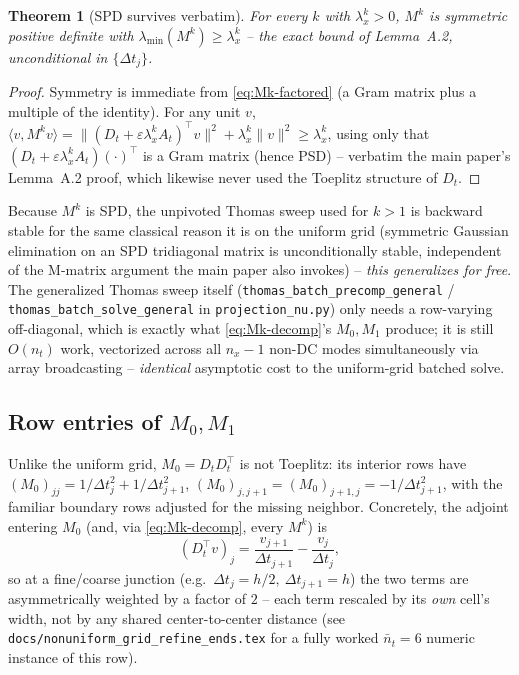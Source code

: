 \documentclass[11pt]{article}
\newtheorem{theorem}{Theorem}
\newcommand{\eps}{\varepsilon}
\newcommand{\dt}{\Delta t}
\newcommand{\code}[1]{\texttt{#1}}
\newcommand{\lx}{\lambda_x^k}
\begin{document}
\begin{theorem}[SPD survives verbatim]
\label{thm:spd}
For every $k$ with $\lx>0$, $M^k$ is symmetric positive definite with $\lambda_{\min}(M^k)\ge\lx$
-- the exact bound of Lemma~A.2, unconditional in $\{\dt_j\}$.
\end{theorem}
\begin{proof}
Symmetry is immediate from \eqref{eq:Mk-factored} (a Gram matrix plus a multiple of the
identity). For any unit $v$, $\langle v, M^kv\rangle = \|(D_t+\eps\lx A_t)^\top v\|^2 + \lx\|v\|^2
\ge \lx$, using only that $(D_t+\eps\lx A_t)(\cdot)^\top$ is a Gram matrix (hence PSD) --
verbatim the main paper's Lemma~A.2 proof, which likewise never used the Toeplitz structure of
$D_t$.
\end{proof}

Because $M^k$ is SPD, the unpivoted Thomas sweep used for $k>1$ is backward stable for the same
classical reason it is on the uniform grid (symmetric Gaussian elimination on an SPD tridiagonal
matrix is unconditionally stable, independent of the M-matrix argument the main paper also
invokes) -- \emph{this generalizes for free}. The generalized Thomas sweep itself
(\code{thomas\_batch\_precomp\_general} / \code{thomas\_batch\_solve\_general} in
\code{projection\_nu.py}) only needs a row-varying off-diagonal, which is exactly what
\eqref{eq:Mk-decomp}'s $M_0,M_1$ produce; it is still $O(n_t)$ work, vectorized across all
$n_x{-}1$ non-DC modes simultaneously via array broadcasting -- \emph{identical} asymptotic cost
to the uniform-grid batched solve.

\subsection{Row entries of $M_0,M_1$}
\label{sec:entries}

Unlike the uniform grid, $M_0=D_tD_t^\top$ is not Toeplitz: its interior rows have
$(M_0)_{jj} = 1/\dt_j^2+1/\dt_{j+1}^2$, $(M_0)_{j,j+1}=(M_0)_{j+1,j}=-1/\dt_{j+1}^2$, with the
familiar boundary rows adjusted for the missing neighbor. Concretely, the adjoint entering $M_0$
(and, via \eqref{eq:Mk-decomp}, every $M^k$) is
\begin{equation}
  (D_t^\top v)_j = \frac{v_{j+1}}{\dt_{j+1}} - \frac{v_j}{\dt_j},
\end{equation}
so at a fine/coarse junction (e.g.\ $\dt_j=h/2,\ \dt_{j+1}=h$) the two terms are asymmetrically
weighted by a factor of $2$ -- each term rescaled by its \emph{own} cell's width, not by any
shared center-to-center distance (see \code{docs/nonuniform\_grid\_refine\_ends.tex} for a fully
worked $\bar n_t=6$ numeric instance of this row).
\end{document}
